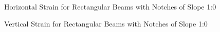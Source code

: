 \documentclass[11pt,a4paper]{article}
\numberwithin{equation}{subsection}
\begin{document}
\begin{figure}[h]
	\begin{center}
	\end{center}
	\caption{Horizontal Strain for Rectangular Beams with Notches of Slope 1:0}
	\label{fig:Round_10_Z}
\end{figure}

\begin{figure}[h]
	\begin{center}
	\end{center}
	\caption{Vertical Strain for Rectangular Beams with Notches of Slope 1:0}
	\label{fig:Round_10_Y}
\end{figure}

\vspace*{\baselineskip}
\end{document}
